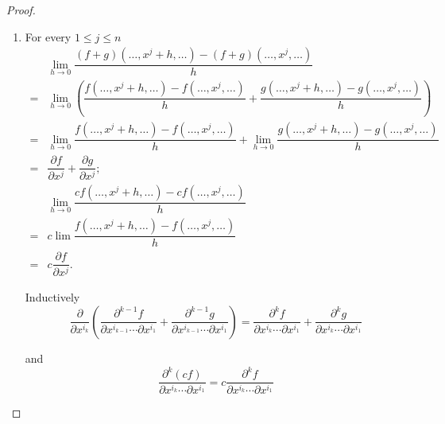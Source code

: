 \begin{proof}
    \begin{enumerate}[itemsep=0pt,label={(\alph*)}]
        \item For every \( 1 \le j \le n \)
              \begingroup
              \allowdisplaybreaks%
              \begin{align*}
                    & \lim\limits_{h \to 0} \dfrac{(f + g)(\ldots, x^{j} + h, \ldots) - (f + g)(\ldots, x^{j}, \ldots)}{h}                                                                                \\
                  = & \lim\limits_{h \to 0} \left( \dfrac{f(\ldots, x^{j} + h, \ldots) - f(\ldots, x^{j}, \ldots)}{h} + \dfrac{g(\ldots, x^{j} + h, \ldots) - g(\ldots, x^{j}, \ldots)}{h} \right)        \\
                  = & \lim\limits_{h \to 0} \dfrac{f(\ldots, x^{j} + h, \ldots) - f(\ldots, x^{j}, \ldots)}{h} + \lim\limits_{h \to 0} \dfrac{g(\ldots, x^{j} + h, \ldots) - g(\ldots, x^{j}, \ldots)}{h} \\
                  = & \dfrac{\partial f}{\partial x^{j}} + \dfrac{\partial g}{\partial x^{j}};                                                                                                            \\
                    & \lim\limits_{h \to 0} \dfrac{c f(\ldots, x^{j} + h, \ldots) - c f(\ldots, x^{j}, \ldots)}{h}                                                                                        \\
                  = & c\lim\limits\dfrac{f(\ldots, x^{j} + h, \ldots) - f(\ldots, x^{j}, \ldots)}{h}                                                                                                      \\
                  = & c\dfrac{\partial f}{\partial x^{j}}.
              \end{align*}
              \endgroup

              Inductively
              \[
                  \dfrac{\partial}{\partial x^{i_{k}}}\left( \dfrac{\partial^{k-1} f}{\partial x^{i_{k-1}} \cdots \partial x^{i_{1}}} + \dfrac{\partial^{k-1} g}{\partial x^{i_{k-1}} \cdots \partial x^{i_{1}}} \right) = \dfrac{\partial^{k} f}{\partial x^{i_{k}} \cdots \partial x^{i_{1}}} + \dfrac{\partial^{k} g}{\partial x^{i_{k}} \cdots \partial x^{i_{1}}}
              \]

              and
              \[
                  \dfrac{\partial^{k}(cf)}{\partial x^{i_{k}} \cdots \partial x^{i_{1}}} = c \dfrac{\partial^{k} f}{\partial x^{i_{k}} \cdots \partial x^{i_{1}}}
              \]


\end{enumerate}
\end{proof}
